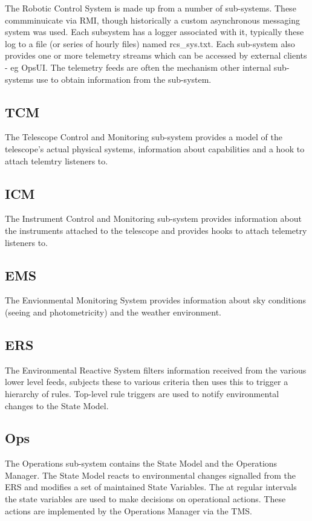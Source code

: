 The Robotic Control System is made up from a number of sub-systems. These commminuicate via RMI, though historically a custom asynchronous messaging system was used. Each subsystem has a logger associated with it, typically these log to a file (or series of hourly files) named rcs_sys.txt. Each sub-system also provides one or more telemetry streams which can be accessed by external clients - eg OpsUI. The telemetry feeds are often the mechanism other internal sub-systems use to obtain information from the sub-system.

\subsection{TCM}
The Telescope Control and Monitoring sub-system provides a model of the telescope's actual physical systems, information about capabilities and a hook to attach telemtry listeners to.

\subsection{ICM}
The Instrument Control and Monitoring sub-system provides information about the instruments attached to the telescope and provides hooks to attach telemetry listeners to.

\subsection{EMS}
The Envionmental Monitoring System provides information about sky conditions (seeing and photometricity) and the weather environment.

\subsection{ERS}
The Environmental Reactive System filters information received from the various lower level feeds, subjects these to various criteria then uses this to trigger a hierarchy of rules. Top-level rule triggers are used to notify environmental changes to the State Model.

\subsection{Ops}
The Operations sub-system contains the State Model and the Operations Manager. The State Model reacts to environmental changes signalled from the ERS and modifies a set of maintained State Variables. The at regular intervals the state variables are used to make decisions on operational actions. These actions are implemented by the Operations Manager via the TMS. 

